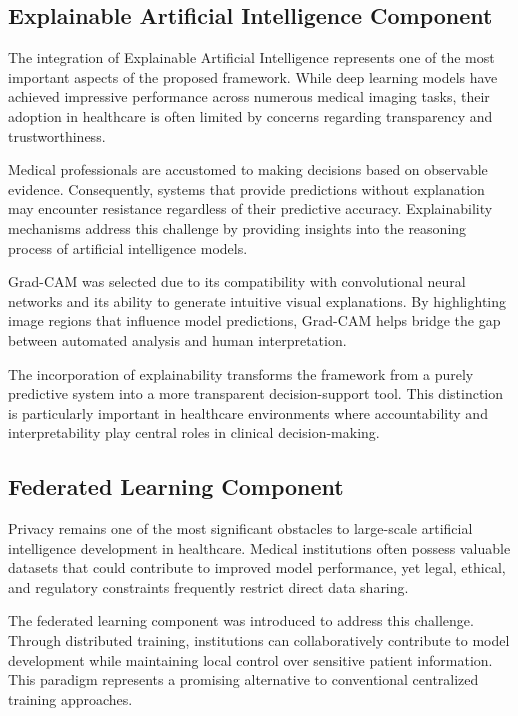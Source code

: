 \subsection{Explainable Artificial Intelligence Component}

The integration of Explainable Artificial Intelligence represents one of the most important aspects of the proposed framework. While deep learning models have achieved impressive performance across numerous medical imaging tasks, their adoption in healthcare is often limited by concerns regarding transparency and trustworthiness.

Medical professionals are accustomed to making decisions based on observable evidence. Consequently, systems that provide predictions without explanation may encounter resistance regardless of their predictive accuracy. Explainability mechanisms address this challenge by providing insights into the reasoning process of artificial intelligence models.

Grad-CAM was selected due to its compatibility with convolutional neural networks and its ability to generate intuitive visual explanations. By highlighting image regions that influence model predictions, Grad-CAM helps bridge the gap between automated analysis and human interpretation.

The incorporation of explainability transforms the framework from a purely predictive system into a more transparent decision-support tool. This distinction is particularly important in healthcare environments where accountability and interpretability play central roles in clinical decision-making.

\subsection{Federated Learning Component}

Privacy remains one of the most significant obstacles to large-scale artificial intelligence development in healthcare. Medical institutions often possess valuable datasets that could contribute to improved model performance, yet legal, ethical, and regulatory constraints frequently restrict direct data sharing.

The federated learning component was introduced to address this challenge. Through distributed training, institutions can collaboratively contribute to model development while maintaining local control over sensitive patient information. This paradigm represents a promising alternative to conventional centralized training approaches.

